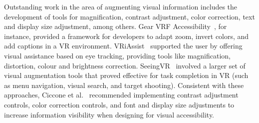 Outstanding work in the area of augmenting visual information includes the development of tools for magnification, contrast adjustment, color correction, text and display size adjustment, among others. Gear VRF Accessibility~\cite{teofilo2018evaluating}, for instance, provided a framework for developers to adapt zoom, invert colors, and add captions in a VR environment. VRiAssist~\cite{masnadi2020vriassist} supported the user by offering visual assistance based on eye tracking, providing tools like magnification, distortion, colour and brightness correction. SeeingVR~\cite{zhao2019seeingvr} involved a larger set of visual augmentation tools that proved effective for task completion in VR (such as menu navigation, visual search, and target shooting).
Consistent with these approaches, Ciccone et al.~\cite{ciccone2023next} recommended implementing contrast adjustment controls, color correction controls, and font and display size adjustments to increase information visibility when designing for visual accessibility.


